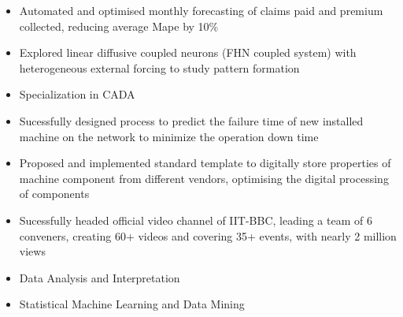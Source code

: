 \documentclass[10pt,a4paper,ragged2e,withhyper]{altacv}
\begin{document}
\begin{paracol}{2}

\par\divider
{}
\begin{itemize}
\item Automated and optimised monthly forecasting of claims paid and premium collected, reducing average Mape by 10\%
\end{itemize}


\par\divider

\begin{itemize}
\item Explored linear diffusive coupled neurons (FHN coupled system) with heterogeneous external forcing to study pattern formation
\end{itemize}


\newpage

\switchcolumn

\label{sec:org81db914}

\divider

\divider


\label{sec:orge9a51b6}
\begin{itemize}
\item Specialization in CADA
\item Sucessfully designed process to predict the failure time of new installed machine on the network to minimize the operation down time
\item Proposed and implemented standard template to digitally store properties of machine component from different vendors, optimising the digital processing of components
\end{itemize}

\divider
{}
\begin{itemize}
\item Sucessfully headed official video channel of IIT-BBC, leading a team of 6 conveners, creating 60+ videos and covering 35+ events, with nearly 2 million views
\item Data Analysis and Interpretation
\item Statistical Machine Learning and Data Mining
\end{itemize}



\end{paracol}
\end{document}
